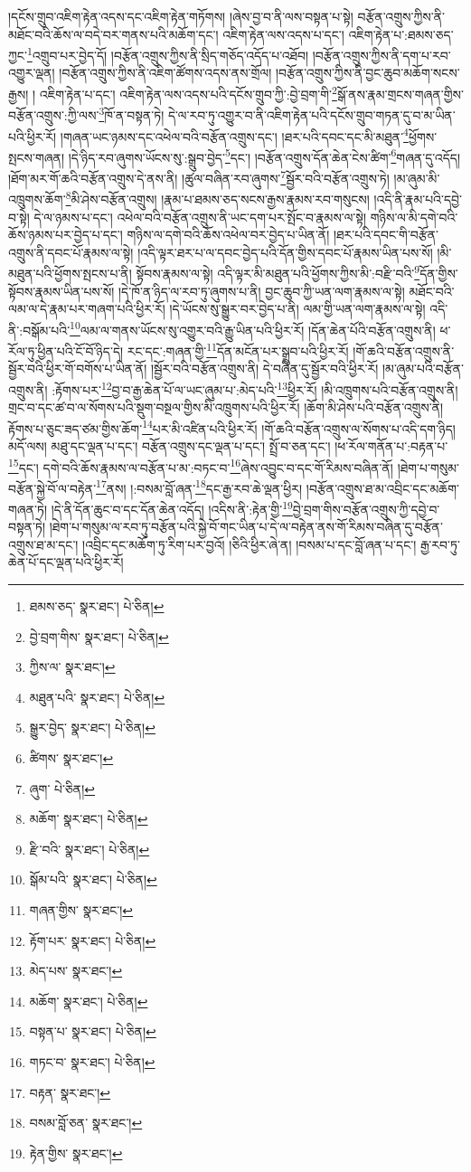 །དངོས་གྲུབ་འཇིག་རྟེན་འདས་དང་འཇིག་རྟེན་གཏོགས། །ཞེས་བྱ་བ་ནི་ལས་བསྟན་པ་སྟེ། བརྩོན་འགྲུས་ཀྱིས་ནི་མཐོང་བའི་ཆོས་ལ་བདེ་བར་གནས་པའི་མཆོག་དང་། འཇིག་རྟེན་ལས་འདས་པ་དང་། འཇིག་རྟེན་པ་:ཐམས་ཅད་ཀྱང་\footnote{ཐམས་ཅད་  སྣར་ཐང་།  པེ་ཅིན། }འགྲུབ་པར་བྱེད་དོ། །བརྩོན་འགྲུས་ཀྱིས་ནི་སྲིད་གཅོད་འདོད་པ་འཐོབ། །བརྩོན་འགྲུས་ཀྱིས་ནི་དག་པ་རབ་འགྱུར་ལྡན། །བརྩོན་འགྲུས་ཀྱིས་ནི་འཇིག་ཚོགས་འདས་ནས་གྲོལ། །བརྩོན་འགྲུས་ཀྱིས་ནི་བྱང་ཆུབ་མཆོག་སངས་རྒྱས། །
འཇིག་རྟེན་པ་དང་། འཇིག་རྟེན་ལས་འདས་པའི་དངོས་གྲུབ་ཀྱི་:བྱེ་བྲག་གི་\footnote{བྱེ་བྲག་གིས་  སྣར་ཐང་།  པེ་ཅིན། }སྒོ་ནས་རྣམ་གྲངས་གཞན་གྱིས་བརྩོན་འགྲུས་:ཀྱི་ལས་\footnote{ཀྱིས་ལ་  སྣར་ཐང་། }ཁོ་ན་བསྟན་ཏེ། དེ་ལ་རབ་ཏུ་འགྱུར་བ་ནི་འཇིག་རྟེན་པའི་དངོས་གྲུབ་གཏན་དུ་བ་མ་ཡིན་པའི་ཕྱིར་རོ། །གཞན་ཡང་ཉམས་དང་འཕེལ་བའི་བརྩོན་འགྲུས་དང་། །ཐར་པའི་དབང་དང་མི་མཐུན་\footnote{མཐུན་པའི་  སྣར་ཐང་།  པེ་ཅིན། }ཕྱོགས་སྤངས་གཞན། །དེ་ཉིད་རབ་ཞུགས་ཡོངས་སུ་:སྒྲུབ་བྱེད་\footnote{སྒྱུར་བྱེད་  སྣར་ཐང་།  པེ་ཅིན། }དང་། །བརྩོན་འགྲུས་དོན་ཆེན་ངེས་ཚིག་\footnote{ཚིགས་  སྣར་ཐང་། }གཞན་དུ་འདོད། །ཐོག་མར་གོ་ཆའི་བརྩོན་འགྲུས་དེ་ནས་ནི། །ཚུལ་བཞིན་རབ་ཞུགས་\footnote{ཞུག་  པེ་ཅིན། }སྦྱོར་བའི་བརྩོན་འགྲུས་ཏེ། །མ་ཞུམ་མི་འཁྲུགས་ཆོག་\footnote{མཆོག་  སྣར་ཐང་།  པེ་ཅིན། }མི་ཤེས་བརྩོན་འགྲུས། །རྣམ་པ་ཐམས་ཅད་སངས་རྒྱས་རྣམས་རབ་གསུངས། །འདི་ནི་རྣམ་པའི་དབྱེ་བ་སྟེ། དེ་ལ་ཉམས་པ་དང་། འཕེལ་བའི་བརྩོན་འགྲུས་ནི་ཡང་དག་པར་སྤོང་བ་རྣམས་ལ་སྟེ། གཉིས་ལ་མི་དགེ་བའི་ཆོས་ཉམས་པར་བྱེད་པ་དང་། གཉིས་ལ་དགེ་བའི་ཆོས་འཕེལ་བར་བྱེད་པ་ཡིན་ནོ། །ཐར་པའི་དབང་གི་བརྩོན་འགྲུས་ནི་དབང་པོ་རྣམས་ལ་སྟེ། །འདི་ལྟར་ཐར་པ་ལ་དབང་བྱེད་པའི་དོན་གྱིས་དབང་པོ་རྣམས་ཡིན་པས་སོ། །མི་མཐུན་པའི་ཕྱོགས་སྤངས་པ་ནི། སྟོབས་རྣམས་ལ་སྟེ། འདི་ལྟར་མི་མཐུན་པའི་ཕྱོགས་ཀྱིས་མི་:བརྫི་བའི་\footnote{རྫི་བའི་  སྣར་ཐང་།  པེ་ཅིན། }དོན་གྱིས་སྟོབས་རྣམས་ཡིན་པས་སོ། །དེ་ཁོ་ན་ཉིད་ལ་རབ་ཏུ་ཞུགས་པ་ནི། བྱང་ཆུབ་ཀྱི་ཡན་ལག་རྣམས་ལ་སྟེ། མཐོང་བའི་ལམ་ལ་དེ་རྣམ་པར་གཞག་པའི་ཕྱིར་རོ། །དེ་ཡོངས་སུ་སྒྱུར་བར་བྱེད་པ་ནི། ལམ་གྱི་ཡན་ལག་རྣམས་ལ་སྟེ། འདི་ནི་:བསྒོམ་པའི་\footnote{སྒོམ་པའི་  སྣར་ཐང་།  པེ་ཅིན། }ལམ་ལ་གནས་ཡོངས་སུ་འགྱུར་བའི་རྒྱུ་ཡིན་པའི་ཕྱིར་རོ། །དོན་ཆེན་པོའི་བརྩོན་འགྲུས་ནི། ཕ་རོལ་ཏུ་ཕྱིན་པའི་ངོ་བོ་ཉིད་དེ། རང་དང་:གཞན་གྱི་\footnote{གཞན་གྱིས་  སྣར་ཐང་། }དོན་མངོན་པར་སྒྲུབ་པའི་ཕྱིར་རོ། །གོ་ཆའི་བརྩོན་འགྲུས་ནི་སྦྱོར་བའི་ཕྱིར་གོ་བགོས་པ་ཡིན་ནོ། །སྦྱོར་བའི་བརྩོན་འགྲུས་ནི། དེ་བཞིན་དུ་སྦྱོར་བའི་ཕྱིར་རོ། །མ་ཞུམ་པའི་བརྩོན་འགྲུས་ནི། :རྟོགས་པར་\footnote{རྟོག་པར་  སྣར་ཐང་།  པེ་ཅིན། }བྱ་བ་རྒྱ་ཆེན་པོ་ལ་ཡང་ཞུམ་པ་:མེད་པའི་\footnote{མེད་པས་  སྣར་ཐང་། }ཕྱིར་རོ། །མི་འཁྲུགས་པའི་བརྩོན་འགྲུས་ནི། གྲང་བ་དང་ཚ་བ་ལ་སོགས་པའི་སྡུག་བསྔལ་གྱིས་མི་འཁྲུགས་པའི་ཕྱིར་རོ། །ཆོག་མི་ཤེས་པའི་བརྩོན་འགྲུས་ནི། རྟོགས་པ་ཅུང་ཟད་ཙམ་གྱིས་ཆོག་\footnote{མཆོག་  སྣར་ཐང་།  པེ་ཅིན། }པར་མི་འཛིན་པའི་ཕྱིར་རོ། །གོ་ཆའི་བརྩོན་འགྲུས་ལ་སོགས་པ་འདི་དག་ཉིད། མདོ་ལས། མཐུ་དང་ལྡན་པ་དང་། བརྩོན་འགྲུས་དང་ལྡན་པ་དང་། སྤྲོ་བ་ཅན་དང་། །ཕ་རོལ་གནོན་པ་:བརྟན་པ་\footnote{བསྟན་པ་  སྣར་ཐང་།  པེ་ཅིན། }དང་། དགེ་བའི་ཆོས་རྣམས་ལ་བརྩོན་པ་མ་:བཏང་བ་\footnote{གཏང་བ་  སྣར་ཐང་།  པེ་ཅིན། }ཞེས་འབྱུང་བ་དང་གོ་རིམས་བཞིན་ནོ། །ཐེག་པ་གསུམ་བརྩོན་སྐྱེ་བོ་ལ་བརྟེན་\footnote{བརྟན་  སྣར་ཐང་། }ནས། །:བསམ་བློ་ཞན་\footnote{བསམ་བློ་ཅན་  སྣར་ཐང་། }དང་རྒྱ་རབ་ཆེ་ལྡན་ཕྱིར། །བརྩོན་འགྲུས་ཐ་མ་འབྲིང་དང་མཆོག་གཞན་ཏེ། །དེ་ནི་དོན་ཆུང་བ་དང་དོན་ཆེན་འདོད། །འདིས་ནི་:རྟེན་གྱི་\footnote{རྟེན་གྱིས་  སྣར་ཐང་། }བྱེ་བྲག་གིས་བརྩོན་འགྲུས་ཀྱི་དབྱེ་བ་བསྟན་ཏེ། །ཐེག་པ་གསུམ་ལ་རབ་ཏུ་བརྩོན་པའི་སྐྱེ་བོ་གང་ཡིན་པ་དེ་ལ་བརྟེན་ནས་གོ་རིམས་བཞིན་དུ་བརྩོན་འགྲུས་ཐ་མ་དང་། །འབྲིང་དང་མཆོག་ཏུ་རིག་པར་བྱའོ། །ཅིའི་ཕྱིར་ཞེ་ན། །བསམ་པ་དང་བློ་ཞན་པ་དང་། རྒྱ་རབ་ཏུ་ཆེན་པོ་དང་ལྡན་པའི་ཕྱིར་རོ། 